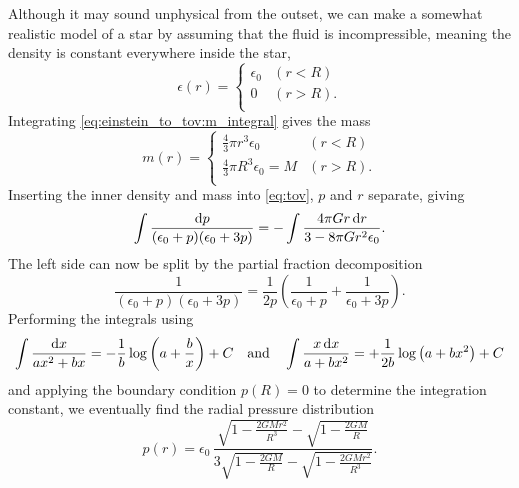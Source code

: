 Although it may sound unphysical from the outset, we can make a somewhat realistic model of a star by assuming that the fluid is incompressible, meaning the density is constant everywhere inside the star,
\begin{equation}
	\epsilon(r) = 
	\begin{cases} 
		\epsilon_0 & (r < R)   \\
		0          & (r > R) . \\
	\end{cases}
\end{equation}
Integrating \cref{eq:einstein_to_tov:m_integral} gives the mass
\begin{equation}
	m(r) = 
	\begin{cases}
		\frac{4}{3} \pi r^3 \epsilon_0     & (r < R)   \\
		\frac{4}{3} \pi R^3 \epsilon_0 = M & (r > R) . \\
	\end{cases}
\end{equation}
Inserting the inner density and mass into \cref{eq:tov}, $p$ and $r$ separate, giving
\begin{equation*}
	\int \frac{\mathop{}\!\mathrm{d} p}{(\epsilon_0+p)(\epsilon_0+3p)} = - \int \frac{4 \pi G r \mathop{}\!\mathrm{d} r}{3-8\pi G r^2 \epsilon_0} .
\end{equation*}
The left side can now be split by the partial fraction decomposition
\begin{equation*}
	\frac{1}{(\epsilon_0+p)(\epsilon_0+3p)} = \frac{1}{2p} \left( \frac{1}{\epsilon_0+p} + \frac{1}{\epsilon_0+3p} \right) .
\end{equation*}
Performing the integrals using
\begin{equation*}
	\int \frac{\mathop{}\!\mathrm{d} x}{a x^2 + b x} = -\frac{1}{b} \log \left( a + \frac{b}{x} \right) + C
	\quad \text{and} \quad
	\int \frac{x \mathop{}\!\mathrm{d} x}{a + b x^2} = +\frac{1}{2 b} \log \left( a + b x^2 \right) + C
\end{equation*}
and applying the boundary condition $p(R) = 0$ to determine the integration constant, we eventually find the radial pressure distribution
\begin{equation}
	p(r) = \epsilon_0 \, \frac{\sqrt{1-\frac{2GMr^2}{R^3}} - \sqrt{1-\frac{2GM}{R}}}{3 \sqrt{1-\frac{2GM}{R}} - \sqrt{1-\frac{2GMr^2}{R^3}}} .
\end{equation}
